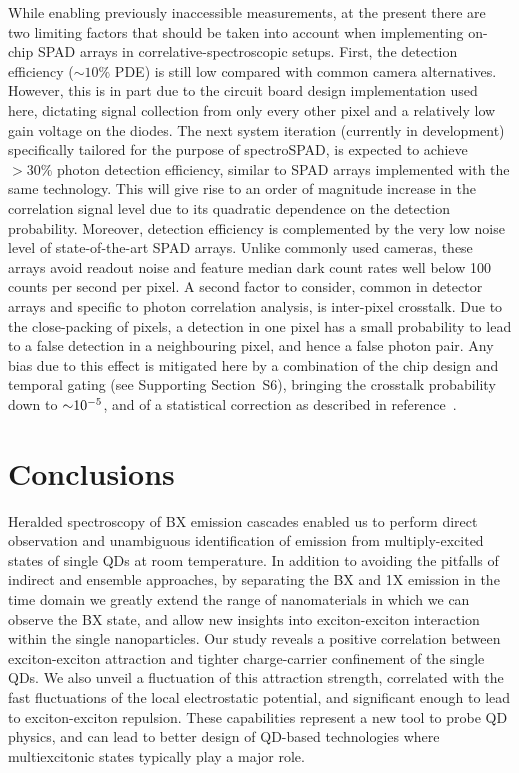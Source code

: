 \documentclass[journal=nalefd, manuscript=letter, layout=twocolumn]{achemso}
\newcommand{\supp}[1]{Supporting Section~S#1}
\begin{document}
While enabling previously inaccessible measurements, at the present there are two limiting factors that should be taken into account when implementing on-chip SPAD arrays in correlative-spectroscopic setups. First, the detection efficiency (${\sim}10\%$ PDE) is still low compared with common camera alternatives. However, this is in part due to the circuit board design implementation used here, dictating signal collection from only every other pixel and a relatively low gain voltage on the diodes. The next system iteration (currently in development) specifically tailored for the purpose of spectroSPAD, is expected to achieve ${>}30\%$ photon detection efficiency, similar to SPAD arrays implemented with the same technology\cite{Lubin2019}. This will give rise to an order of magnitude increase in the correlation signal level due to its quadratic dependence on the detection probability. Moreover, detection efficiency is complemented by the very low noise level of state-of-the-art SPAD arrays. Unlike commonly used cameras, these arrays avoid readout noise and feature median dark count rates well below 100 counts per second per pixel\cite{Antolovic2018}.
A second factor to consider, common in detector arrays and specific to photon correlation analysis, is inter-pixel crosstalk. Due to the close-packing of pixels, a detection in one pixel has a small probability to lead to a false detection in a neighbouring pixel, and hence a false photon pair. Any bias due to this effect is mitigated here by a combination of the chip design and temporal gating (see \supp{6}), bringing the crosstalk probability down to ${\sim}\num{d-5}$, and of a statistical correction as described in reference\cite{Lubin2019}~.


\section*{Conclusions}
Heralded spectroscopy of BX emission cascades enabled us to perform direct observation and unambiguous identification of emission from multiply-excited states of single QDs at room temperature. In addition to avoiding the pitfalls of indirect and ensemble approaches, by separating the BX and 1X emission in the time domain we greatly extend the range of nanomaterials in which we can observe the BX state, and allow new insights into exciton-exciton interaction within the single nanoparticles. Our study reveals a positive correlation between exciton-exciton attraction and tighter charge-carrier confinement of the single QDs. We also unveil a fluctuation of this attraction strength, correlated with the fast fluctuations of the local electrostatic potential, and significant enough to lead to exciton-exciton repulsion. These capabilities represent a new tool to probe QD physics, and can lead to better design of QD-based technologies where multiexcitonic states typically play a major role.
\end{document}
